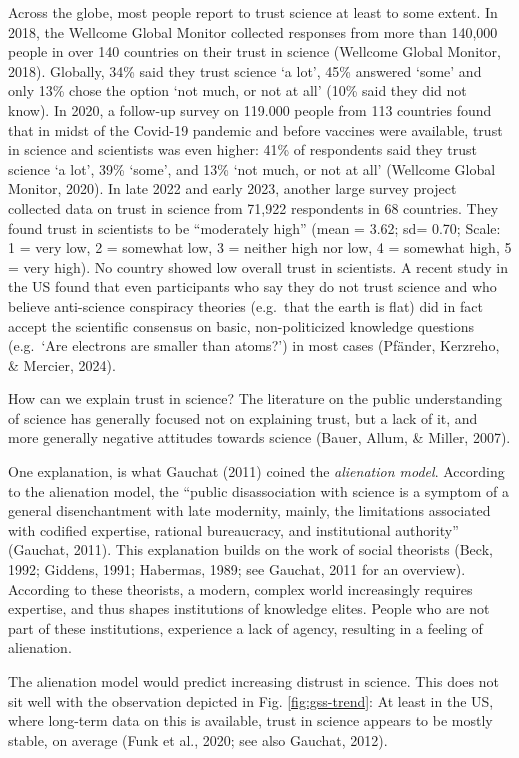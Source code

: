 \documentclass[
  doc,floatsintext]{apa6}
\begin{document}
Across the globe, most people report to trust science at least to some extent. In 2018, the Wellcome Global Monitor collected responses from more than 140,000 people in over 140 countries on their trust in science (Wellcome Global Monitor, 2018). Globally, 34\% said they trust science `a lot', 45\% answered `some' and only 13\% chose the option `not much, or not at all' (10\% said they did not know). In 2020, a follow-up survey on 119.000 people from 113 countries found that in midst of the Covid-19 pandemic and before vaccines were available, trust in science and scientists was even higher: 41\% of respondents said they trust science `a lot', 39\% `some', and 13\% `not much, or not at all' (Wellcome Global Monitor, 2020). In late 2022 and early 2023, another large survey project collected data on trust in science from 71,922 respondents in 68 countries. They found trust in scientists to be ``moderately high'' (mean = 3.62; sd= 0.70; Scale: 1 = very low, 2 = somewhat low, 3 = neither high nor low, 4 = somewhat high, 5 = very high). No country showed low overall trust in scientists. A recent study in the US found that even participants who say they do not trust science and who believe anti-science conspiracy theories (e.g.~that the earth is flat) did in fact accept the scientific consensus on basic, non-politicized knowledge questions (e.g.~`Are electrons are smaller than atoms?') in most cases (Pfänder, Kerzreho, \& Mercier, 2024).

How can we explain trust in science? The literature on the public understanding of science has generally focused not on explaining trust, but a lack of it, and more generally negative attitudes towards science (Bauer, Allum, \& Miller, 2007).

One explanation, is what Gauchat (2011) coined the \emph{alienation model}. According to the alienation model, the ``public disassociation with science is a symptom of a general disenchantment with late modernity, mainly, the limitations associated with codified expertise, rational bureaucracy, and institutional authority'' (Gauchat, 2011). This explanation builds on the work of social theorists (Beck, 1992; Giddens, 1991; Habermas, 1989; see Gauchat, 2011 for an overview). According to these theorists, a modern, complex world increasingly requires expertise, and thus shapes institutions of knowledge elites. People who are not part of these institutions, experience a lack of agency, resulting in a feeling of alienation.

The alienation model would predict increasing distrust in science. This does not sit well with the observation depicted in Fig. \ref{fig:gss-trend}: At least in the US, where long-term data on this is available, trust in science appears to be mostly stable, on average (Funk et al., 2020; see also Gauchat, 2012).
\end{document}
